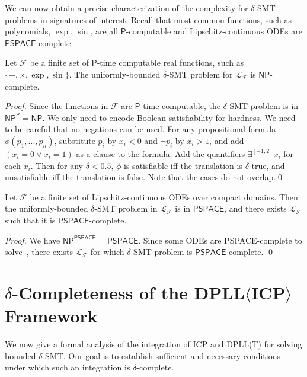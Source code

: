 \documentclass[prodmode]{acmsmall} %
\begin{document}
We can now obtain a precise characterization of the complexity for $\delta$-SMT problems in signatures of interest. Recall that most common functions, such as polynomials, $\exp$, $\sin$, are all $\mathsf{P}$-computable and Lipschitz-continuous ODEs are $\mathsf{PSPACE}$-complete. 
\begin{corollary}
Let $\mathcal{F}$ be a finite set of $\mathsf{P}$-time computable real functions, such as $\{+, \times, \exp, \sin\}$. The uniformly-bounded $\delta$-SMT problem for $\mathcal{L}_{\mathcal{F}}$ is $\mathsf{NP}$-complete.
\end{corollary}
\begin{proof}
Since the functions in $\mathcal{F}$ are $\mathsf{P}$-time computable, the $\delta$-SMT problem is in $\mathsf{NP^P}= \mathsf{NP}$. We only need to encode Boolean satisfiability for hardness. We need to be careful that no negations can be used. For any propositional formula $\phi(p_1,...,p_n)$, substitute $p_i$ by $x_i<0$ and $\neg p_i$ by $x_i>1$, and add $(x_i=0\vee x_i=1)$ as a clause to the formula. Add the quantifiers $\exists^{[-1,2]}x_i$ for each $x_i$. Then for any $\delta<0.5$, $\phi$ is satisfiable iff the translation is $\delta$-true, and unsatisfiable iff the translation is false. Note that the cases do not overlap.\qed 
\end{proof}
\begin{corollary}
Let $\mathcal{F}$ be a finite set of Lipschitz-continuous ODEs over compact domains. Then the uniformly-bounded $\delta$-SMT problem in $\mathcal{L}_{\mathcal{F}}$ is in $\mathsf{PSPACE}$, and there exists $\mathcal{L}_{\mathcal{F}}$ such that it is $\mathsf{PSPACE}$-complete.
\end{corollary}
\begin{proof}
We have $\mathsf{NP^{PSPACE}} = \mathsf{PSPACE}$. Since some ODEs are {\sf PSPACE}-complete to solve~\cite{Kawamura09}, there exists $\mathcal{L}_{\mathcal{F}}$ for which $\delta$-SMT problem is $\mathsf{PSPACE}$-complete. \qed
\end{proof}
\section{$\delta$-Completeness of the DPLL$\langle$ICP$\rangle$ Framework}\label{dpllicp}
We now give a formal analysis of the integration of ICP and DPLL(T) for solving bounded $\delta$-SMT. Our goal is to establish sufficient and necessary conditions under which such an integration is $\delta$-complete. 
\end{document}

